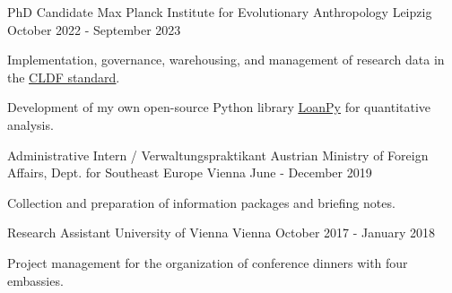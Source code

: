 \begin{cventries}

  \cventry
    {PhD Candidate} %
    {Max Planck Institute for Evolutionary Anthropology} %
    {Leipzig} %
    {October 2022 - September 2023} %
    {
      \begin{cvitems} %
      \item{Implementation, governance, warehousing, and management of research data in the \underline{\href{https://cldf.clld.org/}{CLDF standard}}.}
      \item{Development of my own open-source Python library \underline{\href{https://pypi.org/project/loanpy/}{LoanPy}} for quantitative analysis.}
      \end{cvitems}
    }
    
  \cventry
    {Administrative Intern / Verwaltungspraktikant} %
    {Austrian Ministry of Foreign Affairs, Dept. for Southeast Europe} %
    {Vienna} %
    {June - December 2019} %
    {
      \begin{cvitems} %
        \item{Collection and preparation of information packages and briefing notes.}
      \end{cvitems}
    }

  \cventry
    {Research Assistant} %
    {University of Vienna} %
    {Vienna} %
    {October 2017 - January 2018} %
    {
    \begin{cvitems}
    \item{Project management for the organization of conference dinners with four embassies.}
    \end{cvitems}
    }
    

        
\end{cventries}
